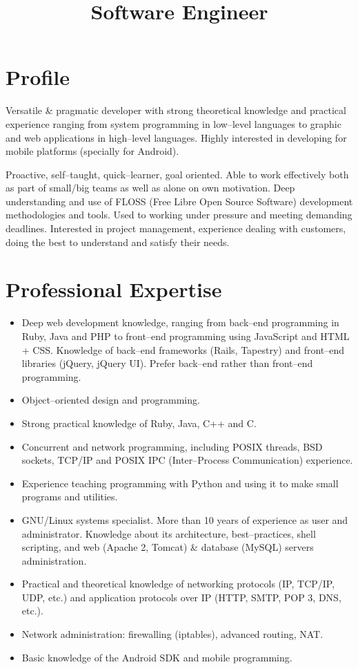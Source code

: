 \documentclass[11pt,a4paper]{moderncv}
\title{Software Engineer}
\begin{document}
\maketitle

\section{Profile}
Versatile \& pragmatic developer with strong theoretical knowledge and
practical experience ranging from system programming in low--level languages to
graphic and web applications in high--level languages. Highly interested in
developing for mobile platforms (specially for Android).

Proactive, self--taught, quick--learner, goal oriented. Able to work
effectively both as part of small/big teams as well as alone on own motivation.
Deep understanding and use of FLOSS (Free Libre Open Source Software)
development methodologies and tools. Used to working under pressure and meeting
demanding deadlines. Interested in project management, experience dealing with
customers, doing the best to understand and satisfy their needs.

\section{Professional Expertise}
\begin{itemize}
\item Deep web development knowledge, ranging from back--end programming in
  Ruby, Java and PHP to front--end programming using JavaScript and HTML + CSS.
  Knowledge of back--end frameworks (Rails, Tapestry) and front--end libraries
  (jQuery, jQuery UI). Prefer back--end rather than front--end programming.
\item Object--oriented design and programming.
\item Strong practical knowledge of Ruby, Java, C++ and C.
\item Concurrent and network programming, including POSIX threads, BSD sockets,
  TCP/IP and POSIX IPC (Inter--Process Communication) experience.
\item Experience teaching programming with Python and using it to make small
  programs and utilities.
\item GNU/Linux systems specialist. More than 10 years of experience as user
  and administrator. Knowledge about its architecture, best--practices, shell
  scripting,  and web (Apache 2, Tomcat) \& database (MySQL) servers
  administration.
\item Practical and theoretical knowledge of networking protocols (IP, TCP/IP,
  UDP, etc.) and application protocols over IP (HTTP, SMTP, POP 3, DNS, etc.).
\item Network administration: firewalling (iptables), advanced routing, NAT.
\item Basic knowledge of the Android SDK and mobile programming.
\end{itemize}
\end{document}
